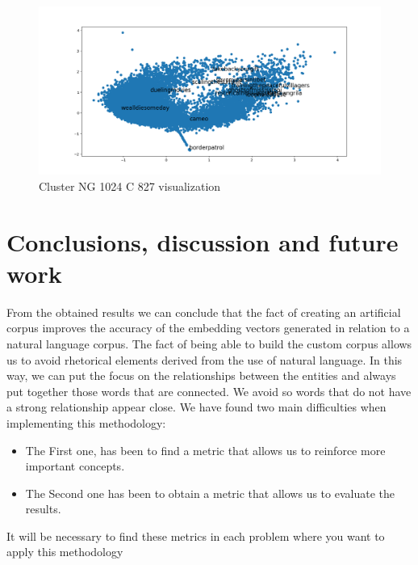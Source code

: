 \documentclass[letterpaper]{article}
\begin{document}
	
	\begin{figure}
	\centering
	\includegraphics[width=1\linewidth]{../images/cluster-ng-1024-c827-zoom-out.png}
	\caption{Cluster NG 1024 C 827 visualization}
	\label{fig:cluster-visualization-zoom-out}
	\end{figure}
	
	
	
	\section{Conclusions, discussion and future work}
	
	From the obtained results we can conclude that the fact of creating an artificial corpus improves the accuracy of the embedding vectors generated in relation to a natural language corpus. The fact of being able to build the custom corpus allows us to avoid rhetorical elements derived from the use of natural language. In this way, we can put the focus on the relationships between the entities and always put together those words that are connected. We avoid so words that do not have a strong relationship appear close. 
	We have found two main difficulties when implementing this methodology:
	\begin{itemize}
	\item The First one, has been to find a metric that allows us to reinforce more important concepts. 
	\item The Second one has been to obtain a metric that allows us to evaluate the results.
	\end{itemize}
	It will be necessary to find these metrics in each problem where you want to apply this methodology
	
\end{document}
